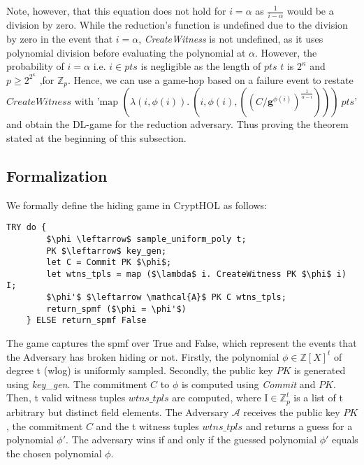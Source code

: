 Note, however, that this equation does not hold for  $i=\alpha$ as $\frac{1}{i-\alpha}$ would be a division by zero. While the reduction's function is undefined due to the division by zero in the event that $i=\alpha$,  \textit{CreateWitness} is not undefined, as it uses polynomial division before evaluating the polynomial at $\alpha$.
However, the probability of $i=\alpha$ i.e. $i\in pts$ is negligible as the length of $pts$ $t$ is $2^\kappa$ and $p\ge 2^{2^\kappa}$ ,for $\mathbb{Z}_p$. Hence, we can use a game-hop based on a failure event to restate $CreateWitness$ with '$\text{map } (\lambda (i,\phi(i)).\ (i,\phi(i), ((C/\mathbf{g}^{\phi(i)})^{\frac{1}{\alpha-i}})))\ pts$' and obtain the DL-game for the reduction adversary. Thus proving the theorem stated at the beginning of this subsection.

 
\subsection*{Formalization}
\label{security:hiding:formalization}
We formally define the hiding game in CryptHOL as follows:
\begin{lstlisting}[language=isabelle]
    TRY do {
        $\phi \leftarrow$ sample_uniform_poly t;
        PK $\leftarrow$ key_gen;
        let C = Commit PK $\phi$;
        let wtns_tpls = map ($\lambda$ i. CreateWitness PK $\phi$ i) I;
        $\phi'$ $\leftarrow \mathcal{A}$ PK C wtns_tpls;
        return_spmf ($\phi = \phi'$)
    } ELSE return_spmf False
\end{lstlisting}
The game captures the spmf over True and False, which represent the events that the Adversary has broken hiding or not.
Firstly, the polynomial $\phi\in\mathbb{Z}[X]^t$ of degree t (wlog) is uniformly sampled.
Secondly, the public key $PK$ is generated using \textit{key\_gen}. 
The commitment $C$ to $\phi$ is computed using \textit{Commit} and $PK$. Then, t valid witness tuples $wtns\_tpls$ are computed, where $\text{I}\in\mathbb{Z}_p^t$ is a list of t arbitrary but distinct field elements.
The Adversary $\mathcal{A}$ receives the public key $PK$, the commitment $C$ and the t witness tuples $wtns\_tpls$ and returns a guess for a polynomial $\phi'$.
The adversary wins if and only if the guessed polynomial $\phi'$ equals the chosen polynomial $\phi$.

